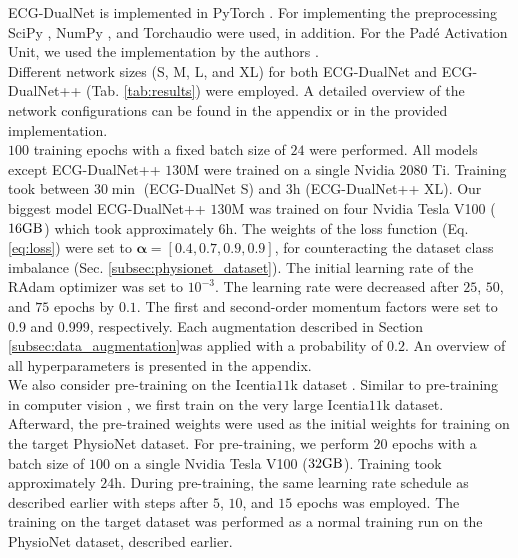 ECG-DualNet is implemented in PyTorch \cite{Paszke2019}. For implementing the preprocessing SciPy \cite{Virtanen2020}, NumPy \cite{Harris2020}, and Torchaudio were used, in addition. For the Pad\'{e} Activation Unit, we used the implementation by the authors \cite{Molina2020}.\\
\indent Different network sizes (S, M, L, and XL) for both ECG-DualNet and ECG-DualNet++ (Tab. \ref{tab:results}) were employed. A detailed overview of the network configurations can be found in the appendix or in the provided implementation.\\
\indent $100$ training epochs with a fixed batch size of $24$ were performed. All models except ECG-DualNet++ $130\si{\mega}$ were trained on a single Nvidia 2080 Ti. Training took between $30\si{\min}$ (ECG-DualNet S) and $3\si{\hour}$ (ECG-DualNet++ XL). Our biggest model ECG-DualNet++ $130\si{\mega}$ was trained on four Nvidia Tesla V100 ($16\si{\giga\byte}$) which took approximately $6\si{\hour}$. The weights of the loss function (Eq. \ref{eq:loss}) were set to $\mathbf{\alpha}=[0.4, 0.7, 0.9, 0.9]$, for counteracting the dataset class imbalance (Sec. \ref{subsec:physionet_dataset}). The initial learning rate of the RAdam optimizer was set to $10^{-3}$. The learning rate were decreased after $25$, $50$, and $75$ epochs by $0.1$. The first and second-order momentum factors were set to 0.9 and 0.999, respectively. Each augmentation described in Section \ref{subsec:data_augmentation}was applied with a probability of $0.2$. An overview of all hyperparameters is presented in the appendix.\\
\indent We also consider pre-training on the Icentia$11$k dataset \cite{Tan2019}. Similar to pre-training in computer vision \cite{Zeiler2014, Girshick2014, He2019}, we first train on the very large Icentia$11$k dataset. Afterward, the pre-trained weights were used as the initial weights for training on the target PhysioNet dataset. For pre-training, we perform $20$ epochs with a batch size of $100$ on a single Nvidia Tesla V100 ($32\si{\giga \byte}$). Training took approximately $24\si{\hour}$. During pre-training, the same learning rate schedule as described earlier with steps after $5$, $10$, and $15$ epochs was employed. The training on the target dataset was performed as a normal training run on the PhysioNet dataset, described earlier.